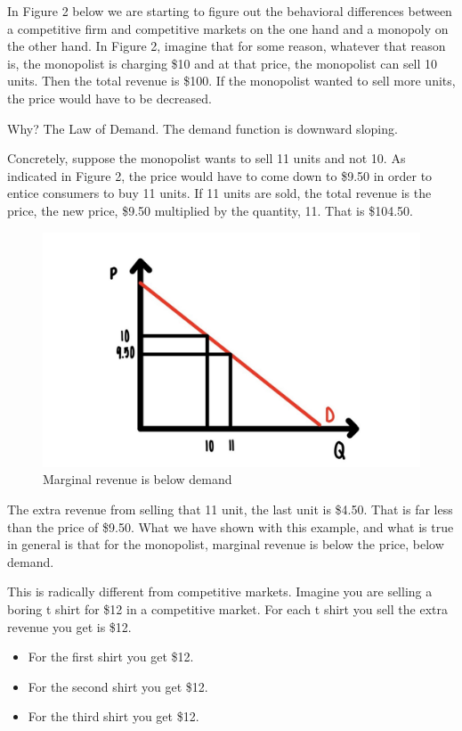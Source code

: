 \documentclass[
]{book}
\providecommand{\tightlist}{%
  \setlength{\itemsep}{0pt}\setlength{\parskip}{0pt}}
\begin{document}
In Figure 2 below we are starting to figure out the behavioral differences between a competitive firm and competitive markets on the one hand and a monopoly on the other hand. In Figure 2, imagine that for some reason, whatever that reason is, the monopolist is charging \$10 and at that price, the monopolist can sell 10 units. Then the total revenue is \$100. If the monopolist wanted to sell more units, the price would have to be decreased.

Why? The Law of Demand. The demand function is downward sloping.

Concretely, suppose the monopolist wants to sell 11 units and not 10. As indicated in Figure 2, the price would have to come down to \$9.50 in order to entice consumers to buy 11 units. If 11 units are sold, the total revenue is the price, the new price, \$9.50 multiplied by the quantity, 11. That is \$104.50.

\begin{figure}

{\centering \includegraphics[width=0.75\linewidth]{img/monopoly/fig2} 

}

\caption{Marginal revenue is below demand}\label{fig:monopoly02}
\end{figure}

The extra revenue from selling that 11 unit, the last unit is \$4.50. That is far less than the price of \$9.50.
What we have shown with this example, and what is true in general is that for the monopolist, marginal revenue is below the price, below demand.

This is radically different from competitive markets. Imagine you are selling a boring t shirt for \$12 in a competitive market. For each t shirt you sell the extra revenue you get is \$12.

\begin{itemize}
\tightlist
\item
  For the first shirt you get \$12.
\item
  For the second shirt you get \$12.
\item
  For the third shirt you get \$12.
\end{itemize}
\end{document}
